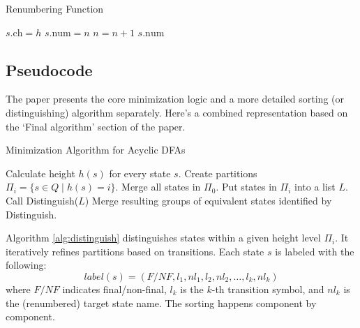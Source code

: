 \begin{algorithm}
    \caption{Renumbering Function} \label{alg:renumbering}
    \begin{algorithmic}[1]
                \State $s.\text{ch} = h$
                \State $s.\text{num} = n$
                \State $n = n + 1$
            \EndIf
            \State \Return $s.\text{num}$
        \EndFunction
    \end{algorithmic}
\end{algorithm}

\subsection{Pseudocode}
The paper presents the core minimization logic and a more detailed sorting (or distinguishing) algorithm separately. Here's a combined representation based on the `Final algorithm' section of the paper.

\begin{algorithm}
    \caption{Minimization Algorithm for Acyclic DFAs}  
    \begin{algorithmic}[1]
    \State Calculate height $h(s)$ for every state $s$.
    \State Create partitions $\Pi_i = \{s \in Q \mid h(s) = i\}$.
    \State Merge all states in $\Pi_0$.
     
        \State {}
        \State Put states in $\Pi_i$ into a list $L$. 
        \State Call Distinguish($L$)
        \State Merge resulting groups of equivalent states identified by Distinguish.
    \EndFor
    \end{algorithmic}
\end{algorithm}

Algorithm \ref{alg:distinguish} distinguishes states within a given height level $\Pi_i$. It iteratively refines partitions based on transitions. Each state $s$ is labeled with the following:
$$label(s) = (F/NF, l_1, nl_1, l_2, nl_2, \dots, l_k, nl_k)$$
where $F/NF$ indicates final/non-final, $l_k$ is the $k$-th transition symbol, and $nl_k$ is the (renumbered) target state name. The sorting happens component by component.

